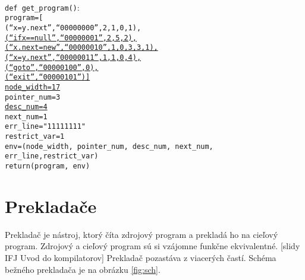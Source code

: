 \texttt{
\\
def get\_program()$\colon$\\
\tab program=[\\
\tab \tab (``x=y.next'',``00000000'',2,1,0,1),\\
\underline{\tab \tab (``ifx==null'',``00000001'',2,5,2),}\\
\underline{\tab \tab (``x.next=new'',``00000010'',1,0,3,3,1),}\\
\underline{\tab \tab (``x=y.next'',``00000011'',1,1,0,4),}\\
\underline{\tab \tab (``goto'',``00000100'',0),}\\
\underline{\tab \tab (``exit'',``00000101'')]}\\
\underline{\tab node\_width=17}\\
\tab pointer\_num=3\\
\underline{\tab desc\_num=4}\\
\tab next\_num=1\\
\tab err\_line="11111111"\\
\tab restrict\_var=1\\
\tab env=(node\_width, pointer\_num, desc\_num, next\_num, err\_line,restrict\_var)\\
\tab return(program, env)
}

\chapter{Prekladače}
Prekladač je nástroj, ktorý číta zdrojový program a prekladá ho na cieľový program.
Zdrojový a cieľový program sú si vzájomne funkčne ekvivalentné. [slidy IFJ Uvod do kompilatorov]
Prekladač pozastáva z viacerých častí. Schéma bežného prekladača je na obrázku \ref{fig:sch}.

